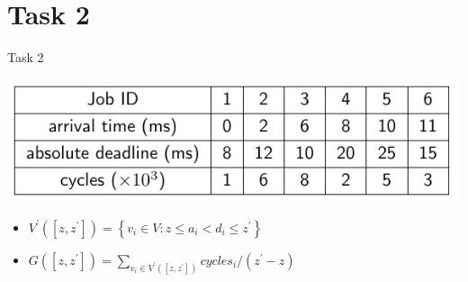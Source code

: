 
\section{Task 2}

\setcounter{task}{1}

\begin{frame}[allowframebreaks]{Task 2}{}
  \begin{tasknoinc}
    \centering
    \includegraphics[width=0.8\paperheight]{./figures/task2.png}
  \end{tasknoinc}
  \begin{requirementsnoinc}
    \begin{itemize}
      \item $V^{\prime}\left(\left[z, z^{\prime}\right]\right)=\left\{v_i \in V: z \leq a_i<d_i \leq z^{\prime}\right\}$
      \item $G\left(\left[z, z^{\prime}\right]\right)=\sum_{v_i \in V^{\prime}\left(\left[z, z^{\prime}\right]\right)} cycles_i /\left(z^{\prime}-z\right)$
    \end{itemize}
  \end{requirementsnoinc}
\end{frame}

